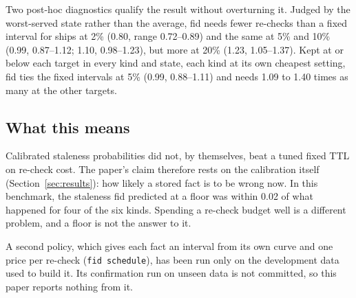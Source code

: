 Two post-hoc diagnostics qualify the result without overturning it. Judged
by the worst-served state rather than the average, fid needs fewer
re-checks than a fixed interval for ships at 2\% (0.80, range 0.72--0.89)
and the same at 5\% and 10\% (0.99, 0.87--1.12; 1.10, 0.98--1.23), but
more at 20\% (1.23, 1.05--1.37). Kept
at or below each target in every kind and state, each kind at its own
cheapest setting, fid ties the fixed intervals at 5\% (0.99, 0.88--1.11)
and needs 1.09 to 1.40 times as many at the other targets.

\subsection{What this means}

Calibrated staleness probabilities did not, by themselves, beat a tuned
fixed TTL on re-check cost. The paper's claim therefore rests on the
calibration itself (Section~\ref{sec:results}): how likely a stored fact is
to be wrong now. In this benchmark, the staleness fid predicted at a floor
was within 0.02 of what happened for four of the six kinds. Spending a re-check budget well is a
different problem, and a floor is not the answer to it.

A second policy, which gives each fact an interval from its own curve and
one price per re-check (\texttt{fid schedule}), has been run only on the
development data used to build it. Its confirmation run on unseen data is
not committed, so this paper reports nothing from it.
